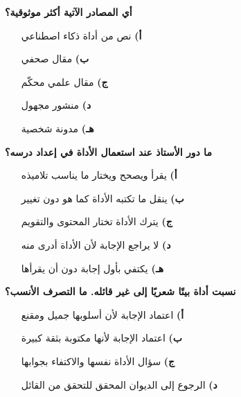 \documentclass[11pt,a4paper]{article}
\begin{document}
\begin{multicols}{2}
\noindent\begin{minipage}{\linewidth}
\hangindent=0.7cm\textbf{أي المصادر الآتية أكثر موثوقية؟}
\begin{itemize}[leftmargin=0.95cm, labelsep=4pt, itemsep=0pt, topsep=2pt, parsep=0pt]
  \item[\textbf{أ)}] نص من أداة ذكاء اصطناعي
  \item[\textbf{ب)}] مقال صحفي
  \item[\textbf{ج)}] مقال علمي محكّم
  \item[\textbf{د)}] منشور مجهول
  \item[\textbf{هـ)}] مدونة شخصية
\end{itemize}
\end{minipage}\par\vspace{7pt plus 4pt}
\noindent\begin{minipage}{\linewidth}
\hangindent=0.7cm\textbf{ما دور الأستاذ عند استعمال الأداة في إعداد درسه؟}
\begin{itemize}[leftmargin=0.95cm, labelsep=4pt, itemsep=0pt, topsep=2pt, parsep=0pt]
  \item[\textbf{أ)}] يقرأ ويصحح ويختار ما يناسب تلاميذه
  \item[\textbf{ب)}] ينقل ما تكتبه الأداة كما هو دون تغيير
  \item[\textbf{ج)}] يترك الأداة تختار المحتوى والتقويم
  \item[\textbf{د)}] لا يراجع الإجابة لأن الأداة أدرى منه
  \item[\textbf{هـ)}] يكتفي بأول إجابة دون أن يقرأها
\end{itemize}
\end{minipage}\par\vspace{7pt plus 4pt}
\noindent\begin{minipage}{\linewidth}
\hangindent=0.7cm\textbf{نسبت أداة بيتًا شعريًا إلى غير قائله. ما التصرف الأنسب؟}
\begin{itemize}[leftmargin=0.95cm, labelsep=4pt, itemsep=0pt, topsep=2pt, parsep=0pt]
  \item[\textbf{أ)}] اعتماد الإجابة لأن أسلوبها جميل ومقنع
  \item[\textbf{ب)}] اعتماد الإجابة لأنها مكتوبة بثقة كبيرة
  \item[\textbf{ج)}] سؤال الأداة نفسها والاكتفاء بجوابها
  \item[\textbf{د)}] الرجوع إلى الديوان المحقق للتحقق من القائل

\end{itemize}
\end{minipage}
\end{multicols}
\end{document}
